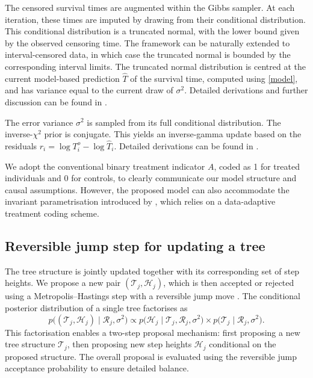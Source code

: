 The censored survival times are augmented within the Gibbs sampler. 
At each iteration, these times are imputed by drawing from their conditional distribution. 
This conditional distribution is a truncated normal, with the lower bound given by the observed censoring time. 
The framework can be naturally extended to interval-censored data, in which case the truncated normal is bounded by the corresponding interval limits. 
The truncated normal distribution is centred at the current model-based prediction $\widehat{T}$ of the survival time, computed using \eqref{model}, and has variance equal to the current draw of $\sigma^2$.
Detailed derivations and further discussion can be found in \citep{TannerWong1987}.


The error variance $\sigma^2$ is sampled from its full conditional distribution.
The inverse-$\chi^2$ prior is conjugate.
This yields an inverse-gamma update based on the residuals $r_i = \log{T^o_i} - \log{\widehat{T}_i}$. %
Detailed derivations can be found in \citet[Section 3.2 and 14.2]{Gelman2013BDA}.

We adopt the conventional binary treatment indicator $A$, coded as 1 for treated individuals and 0 for controls, to clearly communicate our model structure and causal assumptions. 
However, the proposed model can also accommodate the invariant parametrisation introduced by \citet{hahn2020bayesian}, which relies on a data-adaptive treatment coding scheme.  






\subsection{Reversible jump step for updating a tree}\label{subsec:RJ_step}

The tree structure is jointly updated together with its corresponding set of step heights. 
We propose a new pair $(\mathcal{T}_j, \mathcal{H}_j)$, which is then accepted or rejected using a Metropolis--Hastings step with a reversible jump move \citep{ReversibleJump}.
The conditional posterior distribution of a single tree factorises as
\begin{equation}
    p\bigl((\mathcal{T}_j, \mathcal{H}_j) \mid \mathcal{R}_j, \sigma^2\bigr) \propto  p\bigl(\mathcal{H}_j \mid \mathcal{T}_j, \mathcal{R}_j, \sigma^2\bigr) \times p\bigl(\mathcal{T}_j \mid \mathcal{R}_j, \sigma^2\bigr).
\end{equation}
This factorisation enables a two-step proposal mechanism: first proposing a new tree structure $\mathcal{T}_j$, then proposing new step heights $\mathcal{H}_j$ conditional on the proposed structure. 
The overall proposal is evaluated using the reversible jump acceptance probability to ensure detailed balance.

